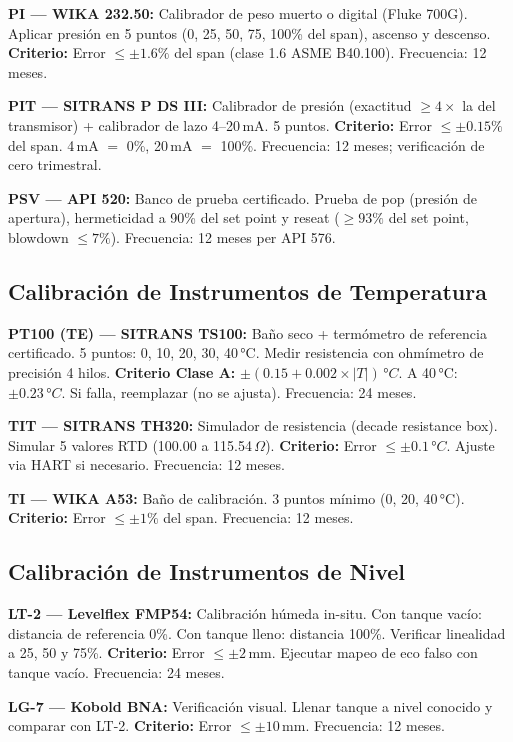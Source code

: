 \documentclass[12pt,letterpaper]{article}
\begin{document}
\textbf{PI — WIKA 232.50:} Calibrador de peso muerto o digital (Fluke 700G). Aplicar presión en 5 puntos (0, 25, 50, 75, 100\% del span), ascenso y descenso. \textbf{Criterio:} Error $\leq\pm1.6\%$ del span (clase 1.6 ASME B40.100). Frecuencia: 12 meses.

\textbf{PIT — SITRANS P DS III:} Calibrador de presión (exactitud $\geq4\times$ la del transmisor) + calibrador de lazo 4--20\,mA. 5 puntos. \textbf{Criterio:} Error $\leq\pm0.15\%$ del span. 4\,mA $=$ 0\%, 20\,mA $=$ 100\%. Frecuencia: 12 meses; verificación de cero trimestral.

\textbf{PSV — API 520:} Banco de prueba certificado. Prueba de pop (presión de apertura), hermeticidad a 90\% del set point y reseat ($\geq93\%$ del set point, blowdown $\leq7\%$). Frecuencia: 12 meses per API 576.

\subsection{Calibración de Instrumentos de Temperatura}

\textbf{PT100 (TE) — SITRANS TS100:} Baño seco + termómetro de referencia certificado. 5 puntos: 0, 10, 20, 30, 40\,°C. Medir resistencia con ohmímetro de precisión 4 hilos. \textbf{Criterio Clase A:} $\pm(0.15+0.002\times|T|)\,°C$. A 40\,°C: $\pm0.23\,°C$. Si falla, reemplazar (no se ajusta). Frecuencia: 24 meses.

\textbf{TIT — SITRANS TH320:} Simulador de resistencia (decade resistance box). Simular 5 valores RTD (100.00 a 115.54\,$\Omega$). \textbf{Criterio:} Error $\leq\pm0.1\,°C$. Ajuste via HART si necesario. Frecuencia: 12 meses.

\textbf{TI — WIKA A53:} Baño de calibración. 3 puntos mínimo (0, 20, 40\,°C). \textbf{Criterio:} Error $\leq\pm1\%$ del span. Frecuencia: 12 meses.

\subsection{Calibración de Instrumentos de Nivel}

\textbf{LT-2 — Levelflex FMP54:} Calibración húmeda in-situ. Con tanque vacío: distancia de referencia 0\%. Con tanque lleno: distancia 100\%. Verificar linealidad a 25, 50 y 75\%. \textbf{Criterio:} Error $\leq\pm2\,$mm. Ejecutar mapeo de eco falso con tanque vacío. Frecuencia: 24 meses.

\textbf{LG-7 — Kobold BNA:} Verificación visual. Llenar tanque a nivel conocido y comparar con LT-2. \textbf{Criterio:} Error $\leq\pm10\,$mm. Frecuencia: 12 meses.
\end{document}
